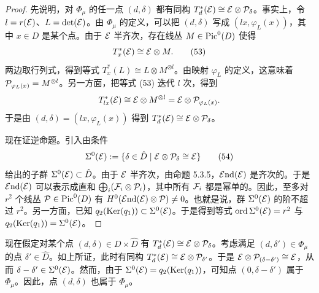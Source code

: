 \begin{proof}
先说明，对 $\Phi_\mu$ 的任一点 $(d,\delta)$ 都有同构 $T^*_d(\mathcal{E})\cong\mathcal{E}\otimes\mathcal{P}_\delta$。事实上，令 $l=r(\mathcal{E})$、$L=\det(\mathcal{E})$。由 $\Phi_\mu$ 的定义，可以把 $(d,\delta)$ 写成 $(lx,\varphi_L(x))$，其中 $x\in D$ 是某个点。由于 $\mathcal{E}$ 半齐次，存在线丛 $M\in\operatorname{Pic}^0(D)$ 使得
\begin{equation}
T^*_x(\mathcal{E})\cong\mathcal{E}\otimes M.\tag{53}
\end{equation}
两边取行列式，得到等式 $T^*_x(L)\cong L\otimes M^{\otimes l}$。由映射 $\varphi_L$ 的定义，这意味着 $\mathcal{P}_{\varphi_L(x)}=M^{\otimes l}$。另一方面，把等式 (53) 迭代 $l$ 次，得到
\begin{equation*}
T^*_{lx}(\mathcal{E})\cong\mathcal{E}\otimes M^{\otimes l}=\mathcal{E}\otimes\mathcal{P}_{\varphi_L(x)}.
\end{equation*}
于是由 $(d,\delta)=(lx,\varphi_L(x))$ 得到 $T^*_d(\mathcal{E})\cong\mathcal{E}\otimes\mathcal{P}_\delta$。

现在证逆命题。引入由条件
\begin{equation}
\Sigma^0(\mathcal{E}):=\{\delta\in\hat D\mid\mathcal{E}\otimes\mathcal{P}_\delta\cong\mathcal{E}\}\tag{54}
\end{equation}
给出的子群 $\Sigma^0(\mathcal{E})\subset\hat D$。由于 $\mathcal{E}$ 半齐次，由命题 5.3.5，$\mathcal{E}\mathrm{nd}(\mathcal{E})$ 是齐次的。于是 $\mathcal{E}\mathrm{nd}(\mathcal{E})$ 可以表示成直和 $\bigoplus_i(\mathcal{F}_i\otimes\mathcal{P}_i)$，其中所有 $\mathcal{F}_i$ 都是幂单的。因此，至多对 $r^2$ 个线丛 $\mathcal{P}\in\operatorname{Pic}^0(D)$ 有 $H^0(\mathcal{E}\mathrm{nd}(\mathcal{E})\otimes\mathcal{P})\neq0$。也就是说，群 $\Sigma^0(\mathcal{E})$ 的阶不超过 $r^2$。另一方面，已知
$q_2(\operatorname{Ker}(q_1))\subset\Sigma^0(\mathcal{E})$。于是得到等式 $\operatorname{ord}\Sigma^0(\mathcal{E})=r^2$ 与 $q_2(\operatorname{Ker}(q_1))=\Sigma^0(\mathcal{E})$。
\end{proof}



现在假定对某个点 $(d,\delta)\in D\times\hat D$ 有 $T^*_d(\mathcal{E})\cong\mathcal{E}\otimes\mathcal{P}_\delta$。考虑满足 $(d,\delta')\in\Phi_\mu$ 的点 $\delta'\in\hat D$。如上所证，此时有同构 $T^*_d(\mathcal{E})\cong\mathcal{E}\otimes\mathcal{P}_{\delta'}$。于是 $\mathcal{E}\otimes\mathcal{P}_{(\delta-\delta')}\cong\mathcal{E}$，从而 $\delta-\delta'\in\Sigma^0(\mathcal{E})$。然而，由于 $\Sigma^0(\mathcal{E})=q_2(\operatorname{Ker}(q_1))$，可知点 $(0,\delta-\delta')$ 属于 $\Phi_\mu$。因此，点 $(d,\delta)$ 也属于 $\Phi_\mu$。

